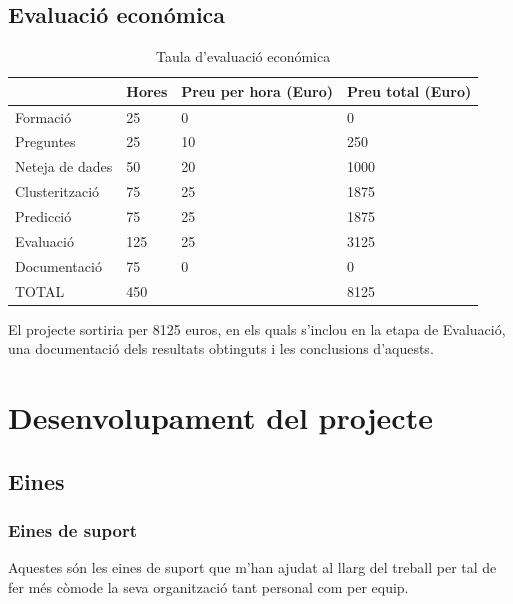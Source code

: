\documentclass[12pt,a4paper,catalan]{article}
\begin{document}
\newpage

\subsection{Evaluació económica}



\begin{table}[h]
\centering

\begin{tabular}{@{}llll@{}}
\toprule
                & Hores & Preu per hora (Euro) & Preu total (Euro) \\ \midrule
Formació        & 25    & 0                 & 0              \\
Preguntes       & 25    & 10                & 250            \\
Neteja de dades & 50    & 20                & 1000           \\
Clusterització  & 75    & 25                & 1875           \\
Predicció       & 75    & 25                & 1875           \\
Evaluació       & 125   & 25                & 3125           \\
Documentació    & 75    & 0                 & 0              \\ \midrule
TOTAL           & 450   &                   & 8125           \\ \bottomrule
\end{tabular}
\caption{Taula d'evaluació económica}
\end{table}

El projecte sortiria per 8125 euros, en els quals s'inclou en la etapa de Evaluació, una documentació dels resultats obtinguts i les conclusions d'aquests.

\newpage

\section{Desenvolupament del projecte}
\subsection{Eines}
\subsubsection{Eines de suport}
Aquestes són les eines de suport que m'han ajudat al llarg del treball per tal de fer més còmode la seva organització tant personal com per equip.
\end{document}
